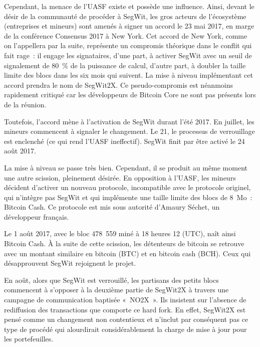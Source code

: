 Cependant, la menace de l'UASF existe et possède une influence. Ainsi, devant le désir de la communauté de procéder à SegWit, les gros acteurs de l'écosystème (entreprises et mineurs) sont amenés à signer un accord le 23 mai 2017, en marge de la conférence Consensus 2017 à New York. Cet accord de New York, comme on l'appellera par la suite, représente un compromis théorique dans le conflit qui fait rage~: il engage les signataires, d'une part, à activer SegWit avec un seuil de signalement de 80~\% de la puissance de calcul, d'autre part, à doubler la taille limite des blocs dans les six mois qui suivent. La mise à niveau implémentant cet accord prendra le nom de SegWit2X. Ce pseudo-compromis est néanmoins rapidement critiqué car les développeurs de Bitcoin Core ne sont pas présents lors de la réunion.

Toutefois, l'accord mène à l'activation de SegWit durant l'été 2017. En juillet, les mineurs commencent à signaler le changement. Le 21, le processus de verrouillage est enclenché (ce qui rend l'UASF ineffectif). SegWit finit par être activé le 24 août 2017.

La mise à niveau se passe très bien. Cependant, il se produit au même moment une autre scission, pleinement désirée. En opposition à l'UASF, les mineurs décident d'activer un nouveau protocole, incompatible avec le protocole originel, qui n'intègre pas SegWit et qui implémente une taille limite des blocs de 8~Mo~: Bitcoin Cash. Ce protocole est mis sous autorité d'Amaury Séchet, un développeur français.

Le 1\ier{} août 2017, avec le bloc 478~559 miné à 18 heures 12 (UTC), naît ainsi Bitcoin Cash. À la suite de cette scission, les détenteurs de bitcoin se retrouve avec un montant similaire en bitcoin (BTC) et en bitcoin cash (BCH). Ceux qui désapprouvent SegWit rejoignent le projet. 

En août, alors que SegWit est verrouillé, les partisans des petits blocs commencent à s'opposer à la deuxième partie de SegWit2X à travers une campagne de communication baptisée «~NO2X~». Ils insistent sur l'absence de rediffusion des transactions que comporte ce hard fork. En effet, SegWit2X est pensé comme un changement non contentieux et n'inclut par conséquent pas ce type de procédé qui alourdirait considérablement la charge de mise à jour pour les portefeuilles.

